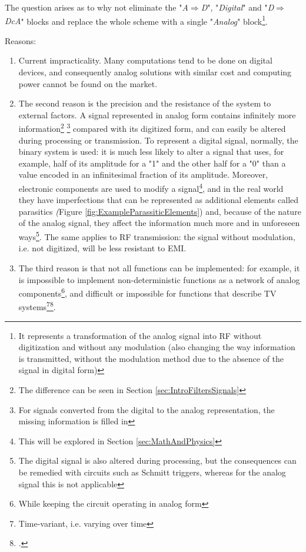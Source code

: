 \documentclass[a4paper, 10pt, final]{article} %
\newcommand{\parenciteit}[2]{\textit{\parencite[#1]{#2}}} %
\begin{document}
    \noindent The question arises as to why not eliminate the "\emph{A$\Rightarrow$D}", "\emph{Digital}" and "\emph{D$\Rightarrow$DcA}" blocks and replace the whole scheme with a single "\emph{Analog}" block\footnote{It represents a transformation of the analog signal into RF without digitization and without any modulation (also changing the way information is transmitted, without the modulation method due to the absence of the signal in digital form)}.

    \nopagebreak
    \noindent Reasons:
    \begin{enumerate}[label=\emph{(\arabic*)}]
        \item Current impracticality.
        Many computations tend to be done on digital devices, and consequently analog solutions with similar cost and computing power cannot be found on the market.
        \item The second reason is the precision and the resistance of the system to external factors.
        A signal represented in analog form contains infinitely more information\footnote{The difference can be seen in Section \ref{sec:IntroFiltersSignals}} \footnote{For signals converted from the digital to the analog representation, the missing information is filled in} compared with its digitized form, and can easily be altered during processing or transmission.
        To represent a digital signal, normally, the binary system is used: it is much less likely to alter a signal that uses, for example, half of its amplitude for a "1" and the other half for a "0" than a value encoded in an infinitesimal fraction of its amplitude.
        Moreover, electronic components are used to modify a signal\footnote{This will be explored in Section \ref{sec:MathAndPhysics}}, and in the real world they have imperfections that can be represented as additional elements called parasitics \emph(Figure \ref{fig:ExampleParassiticElements}) and, because of the nature of the analog signal, they affect the information much more and in unforeseen ways\footnote{The digital signal is also altered during processing, but the consequences can be remedied with circuits such as Schmitt triggers\parenciteit{}{SchmittTrigger:Wiki}, whereas for the analog signal this is not applicable}.
        The same applies to RF transmission: the signal without modulation, i.e. not digitized, will be less resistant to EMI.
        \item The third reason is that not all functions can be implemented: for example, it is impossible to implement non-deterministic functions as a network of analog components\footnote{While keeping the circuit operating in analog form}, and difficult or impossible for functions that describe TV systems\footnote{Time-variant, i.e. varying over time}\:\footcite[]{TimeVariantSystem:Wiki}.
    \end{enumerate}
\end{document}
